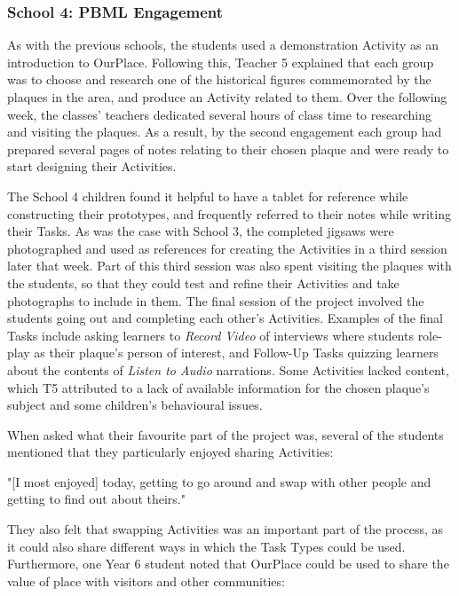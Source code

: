 \subsubsection{School 4: PBML Engagement}
As with the previous schools, the students used a demonstration Activity as an introduction to OurPlace. Following this, Teacher 5 explained that each group was to choose and research one of the historical figures commemorated by the plaques in the area, and produce an Activity related to them. Over the following week, the classes' teachers dedicated several hours of class time to researching and visiting the plaques. As a result, by the second engagement each group had prepared several pages of notes relating to their chosen plaque and were ready to start designing their Activities.

The School 4 children found it helpful to have a tablet for reference while constructing their prototypes, and frequently referred to their notes while writing their Tasks. As was the case with School 3, the completed jigsaws were photographed and used as references for creating the Activities in a third session later that week. Part of this third session was also spent visiting the plaques with the students, so that they could test and refine their Activities and take photographs to include in them. The final session of the project involved the students going out and completing each other's Activities. Examples of the final Tasks include asking learners to \textit{Record Video} of interviews where students role-play as their plaque's person of interest, and Follow-Up Tasks quizzing learners about the contents of \textit{Listen to Audio} narrations. Some Activities lacked content, which T5 attributed to a lack of available information for the chosen plaque's subject and some children's behavioural issues.

When asked what their favourite part of the project was, several of the students mentioned that they particularly enjoyed sharing Activities: 

\begin{displayquote}
"[I most enjoyed] today, getting to go around and swap with other people and getting to find out about theirs."
\end{displayquote}

They also felt that swapping Activities was an important part of the process, as it could also share different ways in which the Task Types could be used. Furthermore, one Year 6 student noted that OurPlace could be used to share the value of place with visitors and other communities: 

